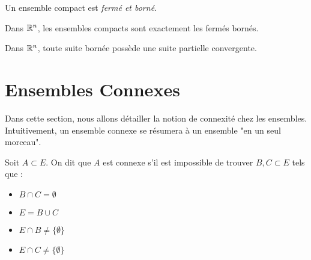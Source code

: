 \begin{proposition}
    Un ensemble compact est \emph{fermé et borné}. 
\end{proposition}

\begin{theorem}[Cas $\R^n$]
    Dans $\R^n$, les ensembles compacts sont exactement les fermés bornés. 
\end{theorem}

\begin{corollary}
    Dans $\R^n$, toute suite bornée possède une suite partielle convergente. 
\end{corollary}


\section{Ensembles Connexes}

Dans cette section, nous allons détailler la notion de connexité chez les ensembles. 
Intuitivement, un ensemble connexe se résumera à un ensemble "en un seul morceau". 

\begin{definition}[Connexité]
    Soit $A \subset E$. On dit que $A$ est connexe s'il est impossible de trouver $B,C \subset E$ tels que : 
    \begin{itemize}
        \item $B \cap C = \emptyset$ 
        \item $E = B \cup C$ 
        \item $E \cap B \not = \{\emptyset\} $ 
        \item $ E \cap C \not = \{\emptyset\} $ 
    \end{itemize}
\end{definition}

